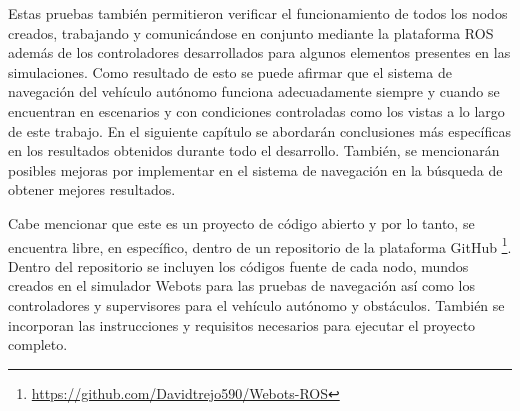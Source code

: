 Estas pruebas también permitieron verificar el funcionamiento de todos los nodos creados, trabajando y comunicándose en conjunto mediante la plataforma ROS además de los controladores desarrollados para algunos elementos presentes en las simulaciones. Como resultado de esto se puede afirmar que el sistema de navegación del vehículo autónomo funciona adecuadamente siempre y cuando se encuentran en escenarios y con condiciones controladas como los vistas a lo largo de este trabajo. En el siguiente capítulo se abordarán conclusiones más específicas en los resultados obtenidos durante todo el desarrollo. También, se mencionarán posibles mejoras por implementar en el sistema de navegación en la búsqueda de obtener mejores resultados.

Cabe mencionar que este es un proyecto de código abierto y por lo tanto, se encuentra libre, en específico, dentro de un repositorio de la plataforma GitHub \footnote{\url{https://github.com/Davidtrejo590/Webots-ROS}}. Dentro del repositorio se incluyen los códigos fuente de cada nodo, mundos creados en el simulador Webots para las pruebas de navegación así como los controladores y supervisores para el vehículo autónomo y obstáculos. También se incorporan las instrucciones y requisitos necesarios para ejecutar el proyecto completo.

